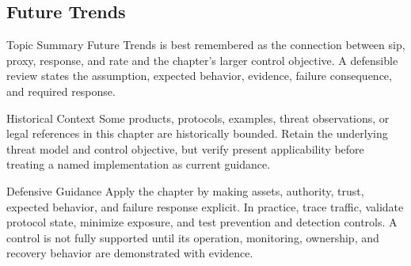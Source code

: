 \documentclass[11pt,letterpaper]{article}
\begin{document}
\subsection*{Future Trends}
\begin{CornellNotesTable}
\end{CornellNotesTable}
\begin{CornellSummaryBox}{Topic Summary}
Future Trends is best remembered as the connection between sip, proxy, response, and rate and the chapter's larger control objective. A defensible review states the assumption, expected behavior, evidence, failure consequence, and required response.
\end{CornellSummaryBox}
\begin{CornellWarningBox}{Historical Context}
Some products, protocols, examples, threat observations, or legal references in this chapter are historically bounded. Retain the underlying threat model and control objective, but verify present applicability before treating a named implementation as current guidance.
\end{CornellWarningBox}
\begin{CornellOverviewBox}{Defensive Guidance}
Apply the chapter by making assets, authority, trust, expected behavior, and failure response explicit. In practice, trace traffic, validate protocol state, minimize exposure, and test prevention and detection controls. A control is not fully supported until its operation, monitoring, ownership, and recovery behavior are demonstrated with evidence.
\end{CornellOverviewBox}
\end{document}
